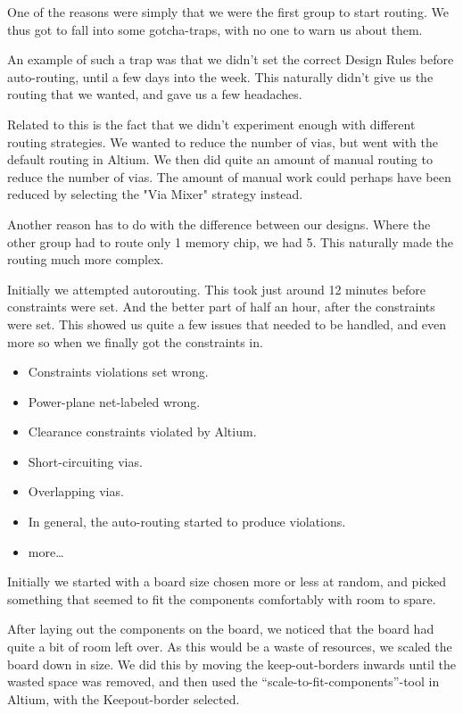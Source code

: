 One of the reasons were simply that we were the first group to start routing. We thus got to fall into some gotcha-traps, with no one to warn us about them.

An example of such a trap was that we didn't set the correct Design Rules before auto-routing, until a few days into the week. This naturally didn't give us the routing that we wanted, and gave us a few headaches.

Related to this is the fact that we didn't experiment enough with different routing strategies. We wanted to reduce the number of vias, but went with the default routing in Altium. We then did quite an amount of manual routing to reduce the number of vias. The amount of manual work could perhaps have been reduced by selecting the "Via Mixer" strategy instead.


Another reason has to do with the difference between our designs. Where the other group had to route only 1 memory chip, we had 5. This naturally made the routing much more complex.

Initially we attempted autorouting. This took just around 12 minutes before constraints were set. And the better part of half an hour, after the constraints were set. This showed us quite a few issues that needed to be handled, and even more so when we finally got the constraints in.

\begin{itemize}
\item Constraints violations set wrong.
\item Power-plane net-labeled wrong.
\item Clearance constraints violated by Altium.
\item Short-circuiting vias.
\item Overlapping vias.
\item In general, the auto-routing started to produce violations.
\item more\ldots
\end{itemize}

Initially we started with a board size chosen more or less at random, and picked something that seemed to fit the components comfortably with room to spare.

After laying out the components on the board, we noticed that the board had quite a bit of room left over. As this would be a waste of resources, we scaled the board down in size. We did this by moving the keep-out-borders inwards until the wasted space was removed, and then used the ``scale-to-fit-components''-tool in Altium, with the Keepout-border selected.

